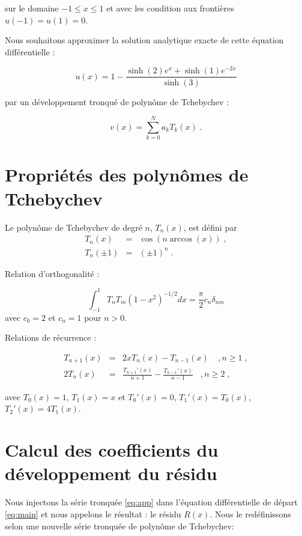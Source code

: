 \documentclass{report}
\begin{document}
sur le domaine $-1\leq x \leq 1$ et avec les condition aux frontières $u(-1)=u(1)=0$.

Nous souhaitons approximer la solution analytique exacte de cette équation différentielle :

\begin{equation}
u(x) = 1- \frac{\sinh(2)e^{x}+\sinh(1)e^{-2x}}{\sinh(3)}
\end{equation}

par un développement tronqué de polynôme de Tchebychev :

\begin{equation}\label{eq:app}
v(x) = \sum_{k=0}^N a_k T_k(x) \;.
\end{equation}

\section{Propriétés des polynômes de Tchebychev}

Le polynôme de Tchebychev de degré $n$, $T_n(x)$, est défini par
\begin{eqnarray}
T_n(x) &=& \cos (n\arccos(x))\;,\\
T_n(\pm1) &=& (\pm1)^n\;.\label{eq+-1}
\end{eqnarray}

Relation d'orthogonalité :

\begin{equation}\label{ortho}
\int_{-1}^{1} T_n T_m (1-x^2)^{-1/2} dx = \frac{\pi}{2} c_n \delta_{nm}
\end{equation}
avec $c_0=2$ et $c_n = 1$ pour $n>0$.

Relations de récurrence :

\begin{eqnarray}
T_{n+1}(x) & = & 2xT_n(x) - T_{n-1}(x) \ \ \ \ \ , n \geq 1\;,\\
2T_n (x) & = & \frac{T_{n+1}'(x)}{n+1} - \frac{T_{n-1}'(x)}{n-1} \ \ \ \ , n \geq 2\;,\label{eq:rec}
\end{eqnarray}

avec $T_0 (x) = 1$, $T_1 (x) = x$ et $T_0' (x) = 0$, $T_1' (x) = T_0 (x)$, $T_2' (x) = 4T_1 (x)$.

\section{Calcul des coefficients du développement du résidu}

Nous injectons la série tronquée \eqref{eq:app} dans l'équation différentielle de départ \eqref{eq:main} et nous appelons le résultat : le résidu $R(x)$. Nous le redéfinissons selon une nouvelle série tronquée de polynôme de Tchebychev:
\end{document}

